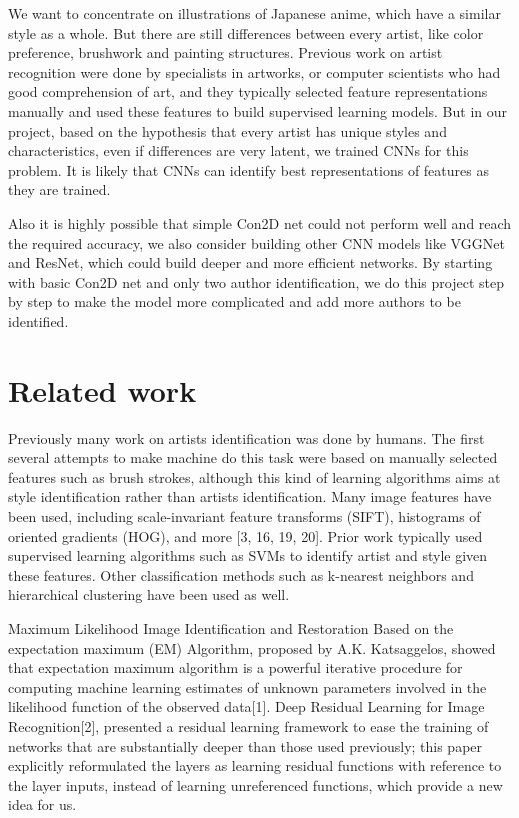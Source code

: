 \documentclass{article}
\begin{document}
We want to concentrate on illustrations of Japanese anime, which have a similar style as a whole. But there are still differences between every artist, like color preference, brushwork and painting structures. Previous work on artist recognition were done by specialists in artworks, or computer scientists who had good comprehension of art, and they typically selected feature representations manually and used these features to build supervised learning models. But in our project, based on the hypothesis that every artist has unique styles and characteristics, even if differences are very latent, we trained CNNs for this problem. It is likely that CNNs can identify best representations of features as they are trained.

Also it is highly possible that simple Con2D net could not perform well and reach the required accuracy, we also consider building other CNN models like VGGNet and ResNet, which could build deeper and more efficient networks. By starting with basic Con2D net and only two author identification, we do this project step by step to make the model more complicated and add more authors to be identified.


\section{Related work}

Previously many work on artists identification was done by humans. The first several attempts to make machine do this task were based on manually selected features such as brush strokes, although this kind of learning algorithms aims at style identification rather than artists identification. Many image features have been used, including scale-invariant feature transforms (SIFT), histograms of oriented gradients (HOG), and more [3, 16, 19, 20]. Prior work typically used supervised learning algorithms such as SVMs to identify artist and style given these features. Other classification methods such as k-nearest neighbors and hierarchical clustering have been used as well.

Maximum Likelihood Image Identification and Restoration Based on the expectation maximum (EM) Algorithm, proposed by A.K. Katsaggelos, showed that expectation maximum algorithm is a powerful iterative procedure for computing machine learning estimates of unknown parameters involved in the likelihood function of the observed data[1]. Deep Residual Learning for Image Recognition[2], presented a residual learning framework to ease the training of networks that are substantially deeper than those used previously; this paper explicitly reformulated the layers as learning residual functions with reference to the layer inputs, instead of learning unreferenced functions, which provide a new idea for us.
\end{document}
